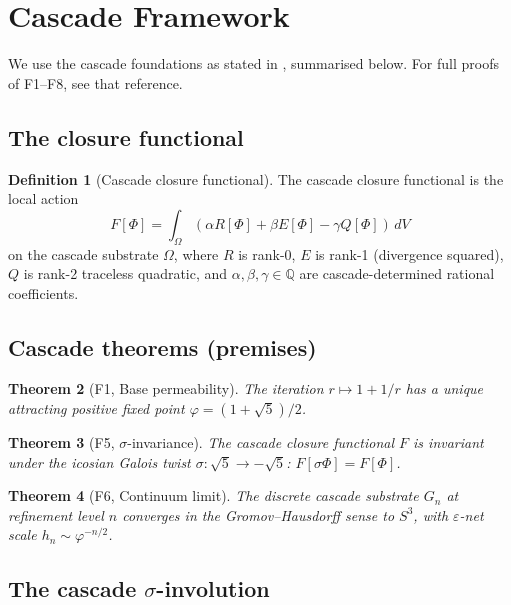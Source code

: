 \documentclass[11pt, a4paper]{amsart}
\newtheorem{theorem}{Theorem}[section]
\theoremstyle{definition}
\newtheorem{definition}[theorem]{Definition}
\newcommand{\Q}{\mathbb{Q}}
\begin{document}
\section{Cascade Framework}

We use the cascade foundations as stated in \cite{cascadeFoundations},
summarised below. For full proofs of F1--F8, see that reference.

\subsection{The closure functional}

\begin{definition}[Cascade closure functional]\label{def:F}
The cascade closure functional is the local action
\[
F[\Phi] = \int_\Omega (\alpha R[\Phi] + \beta E[\Phi] - \gamma Q[\Phi])\, dV
\]
on the cascade substrate $\Omega$, where $R$ is rank-0, $E$ is rank-1
(divergence squared), $Q$ is rank-2 traceless quadratic, and
$\alpha, \beta, \gamma \in \Q$ are cascade-determined rational
coefficients.
\end{definition}

\subsection{Cascade theorems (premises)}

\begin{theorem}[F1, Base permeability]\label{thm:F1}
The iteration $r \mapsto 1 + 1/r$ has a unique attracting positive
fixed point $\varphi = (1 + \sqrt 5)/2$.
\end{theorem}

\begin{theorem}[F5, $\sigma$-invariance]\label{thm:F5}
The cascade closure functional $F$ is invariant under the icosian
Galois twist $\sigma : \sqrt 5 \to -\sqrt 5$: $F[\sigma \Phi] = F[\Phi]$.
\end{theorem}

\begin{theorem}[F6, Continuum limit]\label{thm:F6}
The discrete cascade substrate $G_n$ at refinement level $n$ converges
in the Gromov--Hausdorff sense to $S^3$, with $\varepsilon$-net scale
$h_n \sim \varphi^{-n/2}$.
\end{theorem}

\subsection{The cascade $\sigma$-involution}
\end{document}
